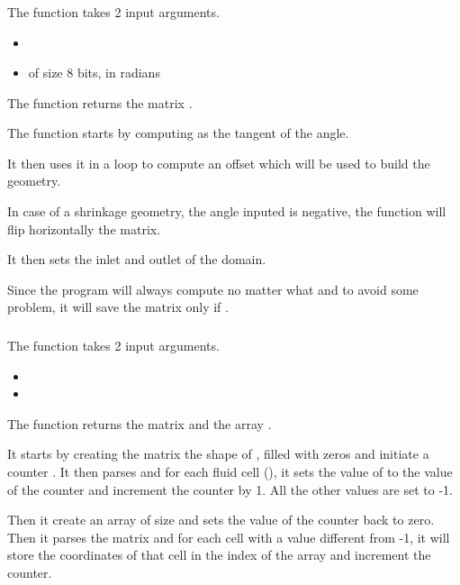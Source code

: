 \subsubsection{\textcolor{func}{}}
The function \textcolor{func}{} takes 2 input arguments.
\begin{itemize}
      \item {} \textcolor{dtype}{}
      \item {} of size 8 bits, in radians
\end{itemize}
The function returns the matrix .

The function starts by computing  as the tangent of the angle.

It then uses it in a  loop to compute an offset which will be used to
build the geometry.

In case of a shrinkage geometry, the angle inputed is negative, the function
will flip horizontally the matrix.

It then sets the inlet and outlet of the domain.

Since the program will always compute  no matter what and to avoid some
problem, it will save the matrix only if .

\subsubsection{\textcolor{func}{}}
The function \textcolor{func}{} takes 2 input
arguments.
\begin{itemize}
      \item {}
      \item {} 
\end{itemize}
The function returns the matrix  and the array .

It starts by creating the matrix  the shape of , filled with zeros
and initiate a counter . It then parses  and for each fluid
cell (), it sets the value of  to the value of the
counter and increment the counter by 1. All the other values are set to -1.

Then it create an array  of size  and
sets the value of the counter back to zero. Then it parses the matrix 
and for each cell with a value different from -1, it will store the coordinates
of that cell in the index  of the array  and
increment the counter.

